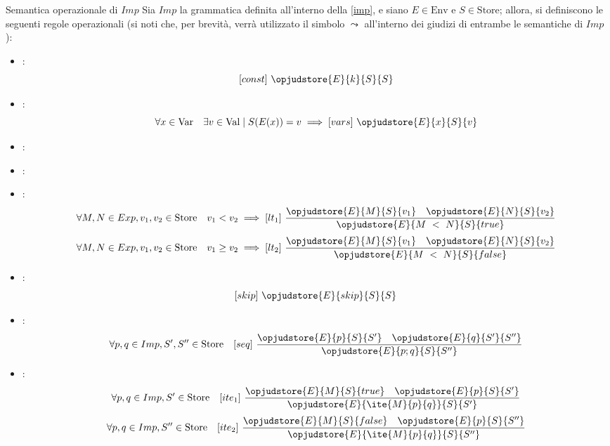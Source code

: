 \documentclass[a4paper, 12pt]{report}
\begin{document}
    \begin{framedprop}[label={imp sem},breakable]{Semantica operazionale di $Imp$}
        Sia $Imp$ la grammatica definita all'interno della \cref{imp}, e siano $E \in \mathrm{Env}$ e $S \in \mathrm{Store}$; allora, si definiscono le seguenti regole operazionali (si noti che, per brevità, verrà utilizzato il simbolo $\leadsto$ all'interno dei giudizi di entrambe le semantiche di $Imp$):

        \begin{itemize}
            \item {}: $$[const] \ \opjudstore{E}{k}{S}{S}$$
            \item {}: $$\forall x \in \mathrm{Var} \quad \exists v \in \mathrm{Val} \mid S(E(x)) = v \implies [vars] \ \opjudstore{E}{x}{S}{v}$$
            \item {}: 
            \item {}: 
            \item {}: $$\forall M, N \in Exp, v_1, v_2 \in \mathrm{Store} \quad v_1 < v_2 \implies [lt_1] \ \dfrac{\opjudstore{E}{M}{S}{v_1} \quad \opjudstore{E}{N}{S}{v_2}}{\opjudstore{E}{M \ < \ N}{S}{true}}$$ $$\forall M, N \in Exp, v_1, v_2 \in \mathrm{Store} \quad v_1 \ge v_2 \implies [lt_2] \ \dfrac{\opjudstore{E}{M}{S}{v_1} \quad \opjudstore{E}{N}{S}{v_2}}{\opjudstore{E}{M \ < \ N}{S}{false}}$$
            \item {}: $$[skip] \ \opjudstore{E}{skip}{S}{S}$$
            \item {}: $$\forall p, q \in Imp, S', S'' \in \mathrm{Store} \quad [seq] \ \dfrac{\opjudstore{E}{p}{ S}{S'} \quad \opjudstore{E}{q}{ S'}{S''}}{\opjudstore{E}{p;q}{S}{S''}}$$
            \item {}: $$\forall p, q \in Imp, S' \in \mathrm{Store} \quad [ite_1] \ \dfrac{\opjudstore{E}{M}{ S}{true} \quad \opjudstore{E}{p}{S}{S'}}{\opjudstore{E}{\ite{M}{p}{q}}{S}{S'}}$$ $$\forall p, q \in Imp, S'' \in \mathrm{Store} \quad [ite_2] \ \dfrac{\opjudstore{E}{M}{S}{false} \quad \opjudstore{E}{p}{S}{S''}}{\opjudstore{E}{\ite{M}{p}{q}}{S}{S''}}$$

\end{itemize}
\end{framedprop}
\end{document}
